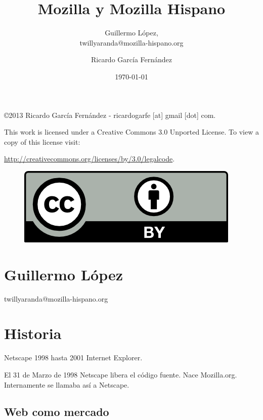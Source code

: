 \documentclass[11pt]{scrartcl}
\title{\textbf{Mozilla y Mozilla Hispano}}
\subtitle{Guillermo L\'opez,\\twillyaranda@mozilla-hispano.org}
\author{Ricardo Garc\'ia Fern\'andez}
\date{\today}
\begin{document}
\maketitle

\vfill

\begin{flushright}
    \copyright  2013 Ricardo Garc\'ia Fern\'andez - ricardogarfe [at] gmail [dot] com.

    This work is licensed under a Creative Commons 3.0 Unported License.
    To view a copy of this license visit:
 
    \url{http://creativecommons.org/licenses/by/3.0/legalcode}.
\end{flushright}

\begin{figure}[h]
    \begin{flushright}	
        \includegraphics{by}
        \label{fig:by}
    \end{flushright}
\end{figure}

\newpage

\section{Guillermo L\'opez}

{\tiny twillyaranda@mozilla-hispano.org}

\section{Historia}
\label{sec:historia}

Netscape 1998 hasta 2001 Internet Explorer.

El 31 de Marzo de 1998 Netscape libera el c\'odigo fuente. Nace Mozilla.org. Internamente se llamaba as\'i a Netscape.


\subsection{Web como mercado}
\label{sub:web-mercado}
\end{document}
